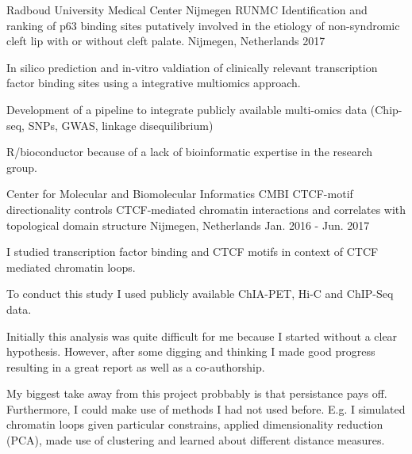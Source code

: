 

\begin{cventries}

  \cventry
    {Radboud University Medical Center Nijmegen RUNMC} %
    {Identification and ranking of p63 binding sites putatively
    involved in the etiology of non-syndromic cleft lip with or
    without cleft palate.} %
    {Nijmegen, Netherlands} %
    {2017} %
    {
      \begin{cvitems} %
        \item {In silico prediction and in-vitro valdiation of clinically relevant transcription factor binding sites using a integrative multiomics approach.}
        \item {Development of a pipeline to integrate publicly available multi-omics data (Chip-seq, SNPs, GWAS, linkage disequilibrium)}
        \item {R/bioconductor because of a lack of bioinformatic expertise in the research group.}
      \end{cvitems}
    }

  \cventry
    {Center for Molecular and Biomolecular Informatics CMBI} %
    {CTCF-motif directionality controls CTCF-mediated chromatin interactions
    and correlates with topological domain structure} %
    {Nijmegen, Netherlands} %
    {Jan. 2016 - Jun. 2017} %
    {
      \begin{cvitems} %
        \item {I studied transcription factor binding and CTCF motifs in context of CTCF mediated chromatin loops.}
        \item {To conduct this study I used publicly available ChIA-PET, Hi-C and ChIP-Seq data.}
        \item {Initially this analysis was quite difficult for me because I started without a clear hypothesis.
              However, after some digging and thinking I made good progress resulting in a great report as well as a co-authorship.}
        \item {My biggest take away from this project probbably is that persistance pays off. 
        Furthermore, I could make use of methods I had not used before. E.g. I simulated chromatin loops given particular constrains,
        applied dimensionality reduction (PCA), made use of clustering and learned about different distance measures.}
      \end{cvitems}
    }
\end{cventries}
